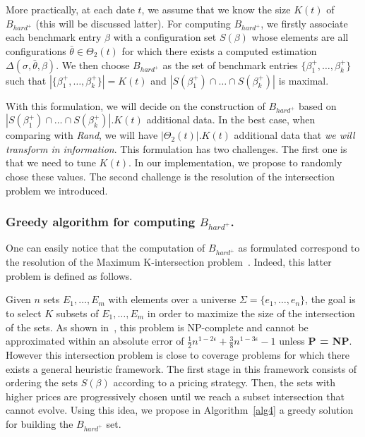\documentclass[10pt, conference, compsocconf]{IEEEtran}
\begin{document}
More practically, at each date $t$, we assume that we know the size $K(t)$ of $B_{hard^+}$ (this will be discussed latter). 
For computing $B_{hard^+}$, we firstly associate each benchmark entry $\beta$ with a 
configuration set $S(\beta)$ whose elements are all configurations  $\bar{\theta} \in \Theta_2(t)$ for which 
there exists a computed estimation $\Delta(\sigma, \bar{\theta}, \beta)$. We then choose 
$B_{hard^+}$ as the set of benchmark entries $\{ \beta^+_1, \dots, \beta^+_k \}$ such that 
$|\{ \beta^+_1, \dots, \beta^+_k \}| = K(t)$ and 
 $|S(\beta^+_1) \cap \dots \cap S(\beta^+_k)|$ is maximal. 


With this formulation, we will decide on the construction of $B_{hard^+}$ based on 
 $|S(\beta^+_1) \cap \dots \cap S(\beta^+_k)|.K(t)$  additional data. In the best case, 
when comparing with {\it Rand}, we will have  $|\Theta_2(t)|.K(t)$ additional data that {\it we will transform in information}.
This formulation has two challenges. The first one is that we need to tune $K(t)$. In our implementation, we propose 
to randomly chose these values. The second challenge is the resolution of the intersection problem we introduced. 


\subsubsection{ Greedy algorithm for computing $B_{hard^+}$.}

One can easily notice that the computation of $B_{hard^+}$ as formulated correspond to the 
resolution of the  Maximum K-intersection problem~\cite{DBLP:journals/ipl/ShiehTY12}. 
Indeed, this latter problem is defined as follows.

Given $n$ sets $E_1,\dots,E_m$ with elements over a universe $\Sigma = \{ e_1,\dots,e_n  \}$, the goal is to select 
$K$ subsets of $E_1,\dots,E_m$ in order to maximize the size of the intersection of the sets.
As shown in~\cite{DBLP:journals/ipl/ShiehTY12}, this problem is NP-complete and cannot be approximated within 
an absolute error of $\frac{1}{2}n^{1-2\epsilon} + \frac{3}{8}n^{1-3\epsilon} - 1$ unless {\bf P = NP}.
However this intersection problem is close to coverage problems for which there exists  
a general heuristic framework. The first stage in this framework consists of ordering the sets $S(\beta)$ according 
to a pricing strategy. Then, the sets with higher prices are progressively chosen until we reach a subset intersection 
that cannot evolve. Using this idea, we propose in Algorithm~\ref{alg4} a greedy solution for building the 
$B_{hard^+}$ set.
\end{document}

